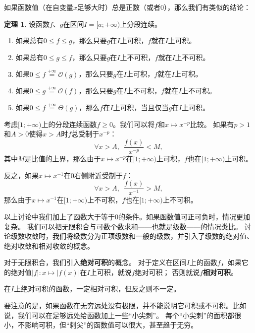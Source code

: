\documentclass[12pt,UTF8]{ctexbook}
\newcommand{\oveq}[1]{\overset{#1}{=}}
\newcommand{\Olim}[1]{\mathcal{O}\left(#1\right)}  %
\newcommand{\Tlim}[1]{\mathcal{\Theta}\left(#1\right)}  %
\theoremstyle{definition}
\newtheorem{tm}{定理}[section]
\theoremstyle{plain}
\begin{document}
如果函数值（在自变量$x$足够大时）总是正数（或者$0$），那么我们有类似的结论：
\begin{tm}
    设函数$f$、$g$在区间$I=[a;+\infty)$上分段连续。
    \begin{enumerate}
        \item 如果总有$0\leqslant f \leqslant g$，那么只要$g$在$I$上可积，$f$就在$I$上可积。
        \item 如果总有$0\leqslant g \leqslant f$，那么只要$g$在$I$上不可积，$f$就在$I$上不可积。
        \item 如果$0\leqslant f \oveq{+\infty} \Olim{g}$，那么只要$g$在$I$上可积，$f$就在$I$上可积。
        \item 如果$0\leqslant g \oveq{+\infty} \Olim{f}$，那么只要$g$在$I$上不可积，$f$就在$I$上不可积。
        \item 如果$0\leqslant f \oveq{+\infty} \Tlim{g}$，那么$f$在$I$上可积，当且仅当$g$在$I$上可积。
    \end{enumerate}
\end{tm}

考虑$[1;+\infty)$上的分段连续函数$f\geqslant 0$。我们可以将$f$和$x\mapsto x^{-p}$比较。
如果有$p>1$和$A>0$使得$x>A$时$f$总受制于$x^{-p}$：
$$ \forall x>A ,\,\,\,\frac{f(x)}{x^{-p}} < M,$$
其中$M$是比值的上界，那么由于$x\mapsto x^{-p}$在$[1;+\infty)$上可积，$f$也在$[1;+\infty)$上可积。

反之，如果$x\mapsto x^{-1}$在$0$右侧附近受制于$f$：
$$ \forall x>A ,\,\,\,\frac{f(x)}{x^{-1}} > M,$$
那么由于$x\mapsto x^{-1}$在$[1;+\infty)$上不可积，$f$也在$[1;+\infty)$上不可积。

以上讨论中我们加上了函数大于等于$0$的条件。如果函数值可正可负时，情况更加复杂。
我们可以把无限积合与可数个数求和——也就是级数——的情况类比。
讨论级数收敛时，我们将级数分为正项级数和一般的级数，并引入了级数的绝对值、绝对收敛和相对收敛的概念。

对于无限积合，我们引入\textbf{绝对可积}的概念。
对于定义在区间$I$上的函数$f$，如果它的绝对值$|f|: x\mapsto |f(x)|$在$I$上可积，就说$f$绝对可积；
否则就说$f$\textbf{相对可积}。

在$I$上绝对可积的函数，一定相对可积，但反之则不一定。

要注意的是，如果函数在无穷远处没有极限，并不能说明它可积或不可积。比如说，我们可以在足够远处给函数加上一些“小尖刺”。
每个“小尖刺”的面积都很小，不影响可积，但“刺尖”的函数值可以很大，甚至趋于无穷。
\end{document}
